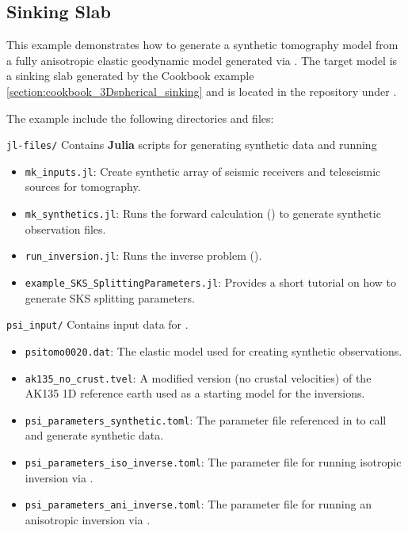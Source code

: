 \subsection{Sinking Slab}
This example demonstrates how to generate a synthetic tomography model from a fully anisotropic elastic geodynamic model generated via \viztomotitle{}. The target model is a sinking slab generated by the Cookbook example \ref{section:cookbook_3Dspherical_sinking} and is located in the \psitomotitle{} repository under .

The  example include the following directories and files:

\texttt{jl-files/} Contains \textbf{Julia} scripts for generating synthetic data and running \psitomotitle{}
\begin{itemize}
    \item \texttt{mk\_inputs.jl}: Create synthetic array of seismic receivers and teleseismic sources for tomography.
    \item \texttt{mk\_synthetics.jl}: Runs the forward calculation () to generate synthetic observation files.
    \item \texttt{run\_inversion.jl}: Runs the inverse problem ().
    \item \texttt{example\_SKS\_SplittingParameters.jl}: Provides a short tutorial on how to generate SKS splitting parameters.
\end{itemize}

\texttt{psi\_input/} Contains input data for \psitomotitle{}.
\begin{itemize}
    \item \texttt{psitomo0020.dat}: The \viztomotitle{} elastic model used for creating synthetic observations.
    \item \texttt{ak135\_no\_crust.tvel}: A modified version (no crustal velocities) of the AK135 1D reference earth used as a starting model for the inversions.
    \item \texttt{psi\_parameters\_synthetic.toml}: The \psitomotitle{} parameter file referenced in  to call  and generate synthetic data.
    \item \texttt{psi\_parameters\_iso\_inverse.toml}: The \psitomotitle{} parameter file for running isotropic inversion via .
    \item \texttt{psi\_parameters\_ani\_inverse.toml}: The \psitomotitle{} parameter file for running an anisotropic inversion via .
\end{itemize}


